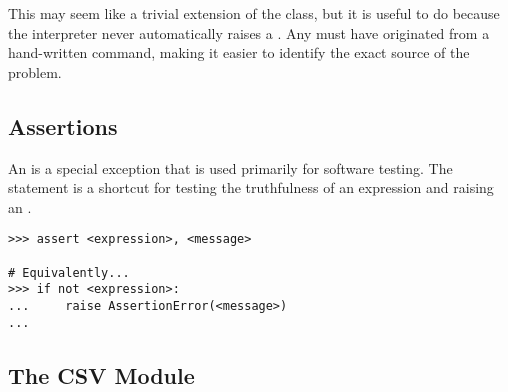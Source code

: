 This may seem like a trivial extension of the  class, but it is useful to do because the interpreter never automatically raises a .
Any  must have originated from a hand-written  command, making it easier to identify the exact source of the problem.

\subsection*{Assertions} %

An  is a special exception that is used primarily for software testing.
The  statement is a shortcut for testing the truthfulness of an expression and raising an .

\begin{lstlisting}
>>> assert <expression>, <message>

# Equivalently...
>>> if not <expression>:
...     raise AssertionError(<message>)
...
\end{lstlisting}

\begin{comment} %
\subsection*{Chaining Exceptions} %
\begin{lstlisting}
>>> try:
>>>     raise ValueError("First Exception")
>>> except ValueError as e:
>>>     raise TypeError("Second Exception") from e
\end{lstlisting}
This syntax makes it possible to see where an error originated from and to ``pass it up'' to the next process.
\end{comment}

\begin{comment}
\subsection*{Buffering} %
The {open()} function also accepts a third argument that specifies buffering size.
\end{comment}

\subsection*{The CSV Module} %

